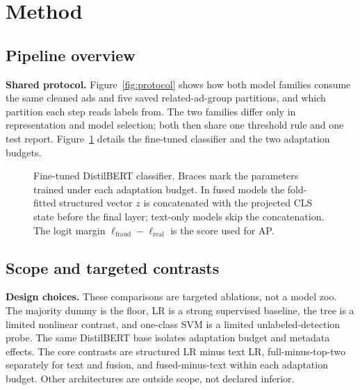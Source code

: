 \section{Method}
\label{method}

\subsection{Pipeline overview}

\textbf{Shared protocol.} Figure~\ref{fig:protocol} shows how both model families consume the same
cleaned ads and five saved related-ad-group partitions, and which partition each step reads labels
from. The two families differ only in representation and model selection; both then share one
threshold rule and one test report. Figure~\ref{fig:finetuned-architecture} details the fine-tuned
classifier and the two adaptation budgets.

\begin{figure}[t]
\centering

\caption{Experimental protocol, repeated on each of the five grouped 60/20/20 splits
($\mathcal{D}_{\mathrm{tr}}$, $\mathcal{D}_{\mathrm{va}}$, $\mathcal{D}_{\mathrm{te}}$; 45 runs in total).
Feature transforms are fitted on $\mathcal{D}_{\mathrm{tr}}$ only, classical hyperparameters are tuned by
three-fold grouped cross-validation within $\mathcal{D}_{\mathrm{tr}}$, and test labels are used only in
the final report. Shaded steps are shared by both families. The majority dummy, not shown, uses a fixed
0.5 threshold.}
\label{fig:protocol}

\vspace{2.5em}

\caption{Fine-tuned DistilBERT classifier. Braces mark the parameters trained under each adaptation
budget. In fused models the fold-fitted structured vector $z$ is concatenated with the projected CLS
state before the final layer; text-only models skip the concatenation. The logit margin $\ell_{\mathrm{fraud}}-\ell_{\mathrm{real}}$ is the score used for AP.}
\label{fig:finetuned-architecture}
\end{figure}

\subsection{Scope and targeted contrasts}

\textbf{Design choices.} These comparisons are targeted ablations, not a model zoo. The majority
dummy is the floor, LR is a strong supervised baseline, the tree is a limited nonlinear contrast,
and one-class SVM is a limited unlabeled-detection probe. The same DistilBERT base isolates
adaptation budget and metadata effects. The core contrasts are structured LR minus text LR,
full-minus-top-two separately for text and fusion, and fused-minus-text within each adaptation
budget. Other architectures are outside scope, not declared inferior.

